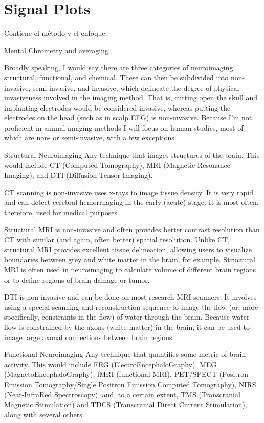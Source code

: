 \chapter{Signal Plots}

Contiene el método y el enfoque.

Mental Chrometry and averaging 



Broadly speaking, I would say there are three categories of neuroimaging: structural, functional, and chemical. These can then be subdivided into non-invasive, semi-invasive, and invasive, which delineate the degree of physical invasiveness involved in the imaging method. That is, cutting open the skull and implanting electrodes would be considered invasive, whereas putting the electrodes on the head (such as in scalp EEG) is non-invasive. Because I'm not proficient in animal imaging methods I will focus on human studies, most of which are non- or semi-invasive, with a few exceptions.

Structural Neuroimaging
Any technique that images structures of the brain. This would include CT (Computed Tomography), MRI (Magnetic Resonance Imaging), and DTI (Diffusion Tensor Imaging).

CT scanning is non-invasive uses x-rays to image tissue density. It is very rapid and can detect cerebral hemorrhaging in the early (acute) stage. It is most often, therefore, used for medical purposes.

Structural MRI is non-invasive and often provides better contrast resolution than CT with similar (and again, often better) spatial resolution. Unlike CT, structural MRI provides excellent tissue delineation, allowing users to visualize boundaries between grey and white matter in the brain, for example. Structural MRI is often used in neuroimaging to calculate volume of different brain regions or to define regions of brain damage or tumor.

DTI is non-invasive and can be done on most research MRI scanners. It involves using a special scanning and reconstruction sequence to image the flow (or, more specifically, constraints in the flow) of water through the brain. Because water flow is constrained by the axons (white matter) in the brain, it can be used to image large axonal connections between brain regions.


Functional Neuroimaging
Any technique that quantifies some metric of brain activity. This would include EEG (ElectroEncephaloGraphy), MEG (MagnetoEncephaloGraphy), fMRI (functional MRI), PET/SPECT (Positron Emission Tomography/Single Positron Emission Computed Tomography), NIRS (Near-InfraRed Spectroscopy), and, to a certain extent, TMS (Transcranial Magnetic Stimulation) and TDCS (Transcranial Direct Current Stimulation), along with several others.